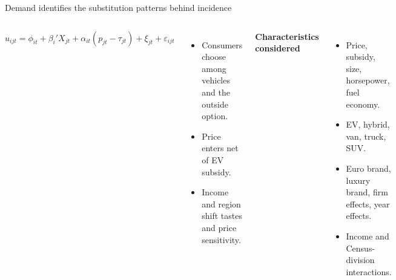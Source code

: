 \documentclass[aspectratio=169,11pt]{beamer}
\begin{document}
\begin{frame}{Demand identifies the substitution patterns behind incidence}
  \begin{columns}[T,onlytextwidth]
      \[
      u_{ijt}=\phi_{it}+\beta_i'X_{jt}+\alpha_{it}(p_{jt}-\tau_{jt})+\xi_{jt}+\varepsilon_{ijt}
      \]
      \begin{itemize}
        \item Consumers choose among vehicles and the outside option.
        \item Price enters net of EV subsidy.
        \item Income and region shift tastes and price sensitivity.
      \end{itemize}
      \textbf{Characteristics considered}
      \begin{itemize}
        \item Price, subsidy, size, horsepower, fuel economy.
        \item EV, hybrid, van, truck, SUV.
        \item Euro brand, luxury brand, firm effects, year effects.
        \item Income and Census-division interactions.
      \end{itemize}
  \end{columns}
\end{frame}
\end{document}
